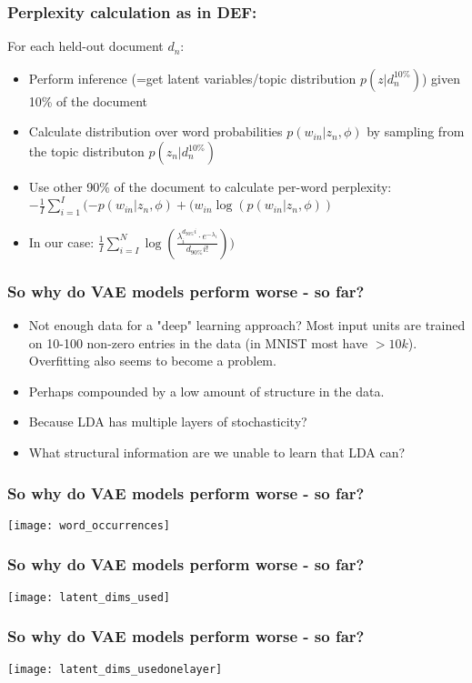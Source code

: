 \documentclass{beamer}
\begin{document}
\begin{frame}
\frametitle{Perplexity calculation as in DEF:}
For each held-out document $d_n$:
\begin{itemize}
\item{Perform inference (=get latent variables/topic distribution $p(z|d_n^{10\%})$)  given 10\% of the document}
\item{Calculate distribution over word probabilities  $p(w_{in}|z_n, \phi)$ by sampling from the topic distributon $p(z_n|d_n^{10\%})$}
\item{Use other 90\% of the document to calculate per-word perplexity: $-\frac{1}{I}\sum_{i=1}^{I}(-p(w_{in}|z_n, \phi)+ (w_{in}\log(p(w_{in}|z_n, \phi))$}
\item{In our case: $\frac{1}{I}\sum_{i=I}^N\log(\frac{\lambda_i^{d_{90\%}i} \cdot e^{-\lambda_i}}{d_{90\%}i!}))$}
\end{itemize}
\end{frame}

\begin{frame}
\frametitle{So why do VAE models perform worse - so far?}
\begin{itemize}
\item{Not enough data for a "deep" learning approach? Most input units are trained on 10-100 non-zero entries in the data (in MNIST most have $>10k$). Overfitting also seems to become a problem. }
\item{Perhaps compounded by a low amount of structure in the data.}
\item{Because LDA has multiple layers of stochasticity?}
\item{What structural information are we unable to learn that LDA can?}
\end{itemize}
\end{frame}


\begin{frame}
\frametitle{So why do VAE models perform worse - so far?}
\texttt{[image: word\_occurrences]}
\end{frame}


\begin{frame}
\frametitle{So why do VAE models perform worse - so far?}
\texttt{[image: latent\_dims\_used]}
\end{frame}

\begin{frame}
\frametitle{So why do VAE models perform worse - so far?}
\texttt{[image: latent\_dims\_usedonelayer]}
\end{frame}
\end{document}
